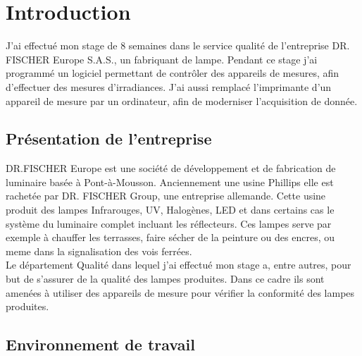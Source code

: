 \documentclass[12pt]{article}
\begin{document}
\thispagestyle{empty}

\newpage

\restoregeometry
\thispagestyle{empty}
\tableofcontents
\newpage
\onehalfspacing

\section{Introduction}

J'ai effectué mon stage de 8 semaines dans le service qualité de l'entreprise DR. FISCHER Europe S.A.S., un fabriquant de lampe.
Pendant ce stage j'ai programmé un logiciel permettant de contrôler des appareils de mesures, afin d'effectuer des mesures d'irradiances.
J'ai aussi remplacé l'imprimante d'un appareil de mesure par un ordinateur, afin de moderniser l'acquisition de donnée.


\newpage
\subsection{Présentation de l'entreprise}

DR.FISCHER Europe est une société de développement et de fabrication de luminaire basée à Pont-à-Mousson.
Anciennement une usine Phillips elle est rachetée par DR. FISCHER Group, une entreprise allemande.
Cette usine produit des lampes Infrarouges, UV, Halogènes, LED et dans certains cas le système du luminaire complet incluant les réflecteurs.
Ces lampes serve par exemple à chauffer les terrasses, faire sécher de la peinture ou des encres, ou meme dans la signalisation des vois ferrées.\\
Le département Qualité dans lequel j'ai effectué mon stage a, entre autres, pour but de s'assurer de la qualité des lampes produites.
Dans ce cadre ils sont amenées à utiliser des appareils de mesure pour vérifier la conformité des lampes produites.
\newpage

\subsection{Environnement de travail}
\end{document}
